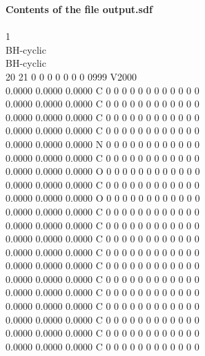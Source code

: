 \documentclass[11pt,titlepage,dvipdfmx,twoside]{book}
\begin{document}
\begin{oframed}
{\bf Contents of the file output.sdf}\\\\
{1 \\
BH-cyclic \\
BH-cyclic \\
 20 21  0  0  0  0  0  0  0  0999 V2000 \\
    0.0000    0.0000    0.0000  C  0  0  0  0  0  0  0  0  0  0  0  0 \\
    0.0000    0.0000    0.0000  C  0  0  0  0  0  0  0  0  0  0  0  0 \\
    0.0000    0.0000    0.0000  C  0  0  0  0  0  0  0  0  0  0  0  0 \\
    0.0000    0.0000    0.0000  C  0  0  0  0  0  0  0  0  0  0  0  0 \\
    0.0000    0.0000    0.0000  N  0  0  0  0  0  0  0  0  0  0  0  0 \\
    0.0000    0.0000    0.0000  C  0  0  0  0  0  0  0  0  0  0  0  0 \\
    0.0000    0.0000    0.0000  O  0  0  0  0  0  0  0  0  0  0  0  0 \\
    0.0000    0.0000    0.0000  C  0  0  0  0  0  0  0  0  0  0  0  0 \\
    0.0000    0.0000    0.0000  O  0  0  0  0  0  0  0  0  0  0  0  0 \\
    0.0000    0.0000    0.0000  C  0  0  0  0  0  0  0  0  0  0  0  0 \\
    0.0000    0.0000    0.0000  C  0  0  0  0  0  0  0  0  0  0  0  0 \\
    0.0000    0.0000    0.0000  C  0  0  0  0  0  0  0  0  0  0  0  0 \\
    0.0000    0.0000    0.0000  C  0  0  0  0  0  0  0  0  0  0  0  0 \\
    0.0000    0.0000    0.0000  C  0  0  0  0  0  0  0  0  0  0  0  0 \\
    0.0000    0.0000    0.0000  C  0  0  0  0  0  0  0  0  0  0  0  0 \\
    0.0000    0.0000    0.0000  C  0  0  0  0  0  0  0  0  0  0  0  0 \\
    0.0000    0.0000    0.0000  C  0  0  0  0  0  0  0  0  0  0  0  0 \\
    0.0000    0.0000    0.0000  C  0  0  0  0  0  0  0  0  0  0  0  0 \\
    0.0000    0.0000    0.0000  C  0  0  0  0  0  0  0  0  0  0  0  0 \\
    0.0000    0.0000    0.0000  C  0  0  0  0  0  0  0  0  0  0  0  0 \\
}
\end{oframed}
\end{document}
